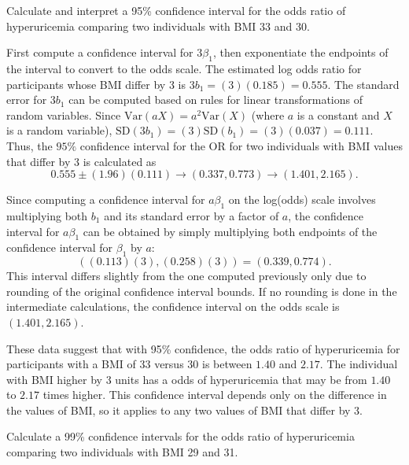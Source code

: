 \begin{examplewrap}
\begin{nexample}{Calculate and interpret a 95\% confidence interval for the odds ratio of hyperuricemia comparing two individuals with BMI 33 and 30.}
\label{example:confidenceIntervalHyperuricemiaBmi}

First compute a confidence interval for $3\beta_1$, then exponentiate the endpoints of the interval to convert to the odds scale. The estimated log odds ratio for participants whose BMI differ by 3 is $3b_1 = (3)(0.185) = 0.555$. The standard error for $3b_1$ can be computed based on rules for linear transformations of random variables. Since $\text{Var}(aX) = a^2 \text{Var}(X)$ (where $a$ is a constant and $X$ is a random variable), $\text{SD}(3b_1) = (3)\text{SD}(b_1) = (3)(0.037) = 0.111$. Thus, the $95\%$ confidence interval for the OR for two individuals with BMI values that differ by 3 is calculated as
  \[0.555 \pm (1.96)(0.111) \longrightarrow (0.337, 0.773) \longrightarrow (1.401, 2.165).  \]

Since computing a confidence interval for $a\beta_1$ on the log(odds) scale involves multiplying both $b_1$ and its standard error by a factor of $a$, the confidence interval for $a\beta_1$ can be obtained by simply multiplying both endpoints of the confidence interval for $\beta_1$ by $a$:
  \[((0.113)(3), (0.258)(3)) = (0.339, 0.774). \]
This interval differs slightly from the one computed previously only due to rounding of the original confidence interval bounds. If no rounding is done in the intermediate calculations, the confidence interval on the odds scale is $(1.401, 2.165)$.

These data suggest that with 95\% confidence, the odds ratio of hyperuricemia for participants with a BMI of 33 versus 30 is between $1.40$ and $2.17$. The individual with BMI higher by 3 units has a odds of hyperuricemia that may be from $1.40$ to $2.17$ times higher. This confidence interval depends only on the difference in the values of BMI, so it applies to any two values of BMI that differ by 3.
\end{nexample}
\end{examplewrap}


\begin{exercisewrap}
  \begin{nexercise}
    Calculate a 99\% confidence intervals for the odds ratio of hyperuricemia comparing two individuals with BMI 29 and 31.      \footnotemark{}
  \end{nexercise}
\end{exercisewrap}

